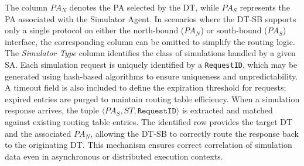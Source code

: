 The column $PA_N$ denotes the PA selected by the DT, while $PA_S$ represents the PA associated with the Simulator Agent. In scenarios where the DT-SB supports only a single protocol on either the north-bound ($PA_N$) or south-bound ($PA_S$) interface, the corresponding column can be omitted to simplify the routing logic.
The \emph{Simulator Type} column identifies the class of simulations handled by a given SA. Each simulation request is uniquely identified by a \texttt{RequestID}, which may be generated using hash-based algorithms to ensure uniqueness and unpredictability. A timeout field is also included to define the expiration threshold for requests; expired entries are purged to maintain routing table efficiency. When a simulation response arrives, the tuple $\langle PA_S, ST, \texttt{RequestID} \rangle$ is extracted and matched against existing routing table entries. The identified row provides the target DT and the associated $PA_N$, allowing the DT-SB to correctly route the response back to the originating DT. This mechanism ensures correct correlation of simulation data even in asynchronous or distributed execution contexts.




